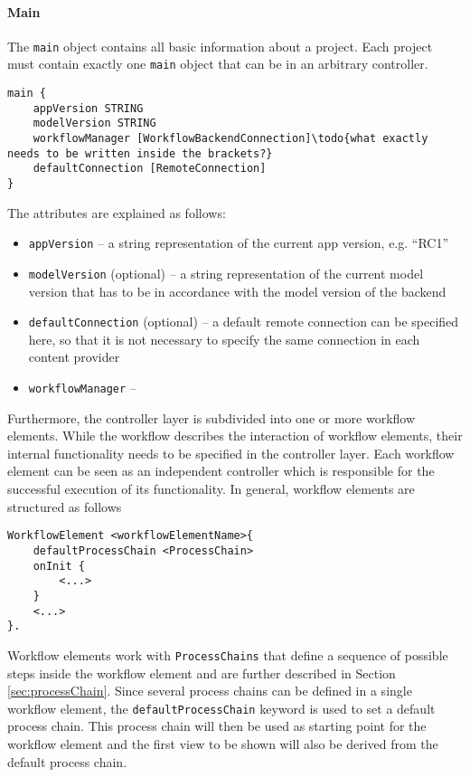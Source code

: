 
\paragraph{Main}
The \lstinline!main! object contains all basic information about a project. Each project must contain exactly one \lstinline!main! object that can be in an arbitrary controller.

\begin{lstlisting}
main {
	appVersion STRING
	modelVersion STRING
	workflowManager [WorkflowBackendConnection]\todo{what exactly needs to be written inside the brackets?}
	defaultConnection [RemoteConnection]
}
\end{lstlisting}

The attributes are explained as follows:
\begin{itemize}
\item \lstinline!appVersion! -- a string representation of the current app version, e.g. \enquote{RC1}
\item  \lstinline!modelVersion! (optional) -- a string representation of the current model version that has to be in accordance with the model version of the backend
\item  \lstinline!defaultConnection! (optional) -- a default remote connection can be specified here, so that it is not necessary to specify the same connection in each content provider
\item \lstinline!workflowManager! -- 
\end{itemize}

Furthermore, the controller layer is subdivided into one or more workflow elements. While the workflow describes the interaction of workflow elements, their internal functionality needs to be specified in the controller layer. Each workflow element can be seen as an independent controller which is responsible for the successful execution of its functionality. In general, workflow elements are structured as follows

\begin{lstlisting}
WorkflowElement <workflowElementName>{
	defaultProcessChain <ProcessChain>
	onInit {
		<...>
	}
	<...>
}.
\end{lstlisting}

Workflow elements work with \lstinline!ProcessChains! that define a sequence of possible steps inside the workflow element and are further described in Section \ref{sec:processChain}. Since several process chains can be defined in a single workflow element, the \lstinline!defaultProcessChain! keyword is used to set a default process chain. This process chain will then be used as starting point for the workflow element and the first view to be shown will also be derived from the default process chain.

